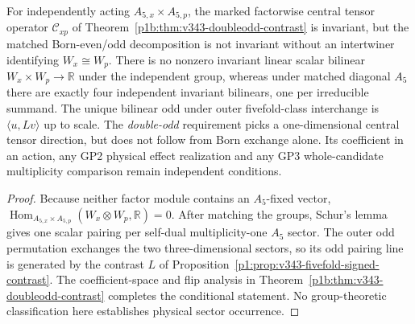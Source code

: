 \documentclass[11pt,a4paper]{article}
\begin{document}
\begin{proposition}
\label{p2f:prop:v343-signed-owner-firewall}
For independently acting $A_{5,x}\times A_{5,p}$, the marked
factorwise central tensor operator $\mathcal C_{xp}$ of
Theorem~\ref{p1b:thm:v343-doubleodd-contrast} is invariant,
but the matched Born-even/odd decomposition is not invariant
without an intertwiner identifying $W_x\cong W_p$.
There is no nonzero invariant linear scalar bilinear
$W_x\times W_p\to\mathbb R$ under the independent group,
whereas under matched diagonal $A_5$ there are exactly four
independent invariant bilinears, one per irreducible summand.
The unique bilinear odd under outer fivefold-class interchange
is $\langle u,Lv\rangle$ up to scale.
The \emph{double-odd} requirement picks a one-dimensional
central tensor direction, but does not follow from Born exchange
alone.  Its coefficient in an action, any GP2 physical effect
realization and any GP3 whole-candidate multiplicity comparison
remain independent conditions.
\end{proposition}
\begin{proof}
Because neither factor module contains an $A_5$-fixed vector,
$\operatorname{Hom}_{A_{5,x}\times A_{5,p}}(W_x\otimes W_p,\mathbb R)=0$.
After matching the groups, Schur's lemma gives one scalar pairing
per self-dual multiplicity-one $A_5$ sector.  The outer odd
permutation exchanges the two three-dimensional sectors, so its
odd pairing line is generated by the contrast $L$ of
Proposition~\ref{p1:prop:v343-fivefold-signed-contrast}.
The coefficient-space and flip analysis in
Theorem~\ref{p1b:thm:v343-doubleodd-contrast} completes the
conditional statement.  No group-theoretic classification here
establishes physical sector occurrence.
\end{proof}

\printbibliography
\end{document}
